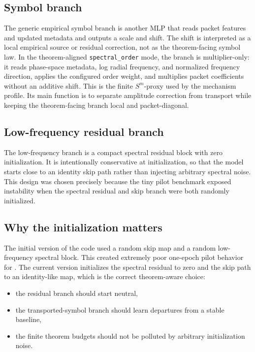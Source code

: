 \subsection{Symbol branch}

The generic empirical symbol branch is another MLP that reads packet features and updated metadata and outputs a scale and shift. The shift is interpreted as a local empirical source or residual correction, not as the theorem-facing symbol law. In the theorem-aligned \texttt{spectral\_order} mode, the branch is multiplier-only: it reads phase-space metadata, log radial frequency, and normalized frequency direction, applies the configured order weight, and multiplies packet coefficients without an additive shift. This is the finite \(S^m\)-proxy used by the mechanism profile. Its main function is to separate amplitude correction from transport while keeping the theorem-facing branch local and packet-diagonal.

\subsection{Low-frequency residual branch}

The low-frequency branch is a compact spectral residual block with zero initialization. It is intentionally conservative at initialization, so that the model starts close to an identity skip path rather than injecting arbitrary spectral noise. This design was chosen precisely because the tiny pilot benchmark exposed instability when the spectral residual and skip branch were both randomly initialized.

\subsection{Why the initialization matters}

The initial version of the code used a random skip map and a random low-frequency spectral block. This created extremely poor one-epoch pilot behavior for \MiNO. The current version initializes the spectral residual to zero and the skip path to an identity-like map, which is the correct theorem-aware choice:
\begin{itemize}
\item the residual branch should start neutral,
\item the transported-symbol branch should learn departures from a stable baseline,
\item the finite theorem budgets should not be polluted by arbitrary initialization noise.
\end{itemize}


